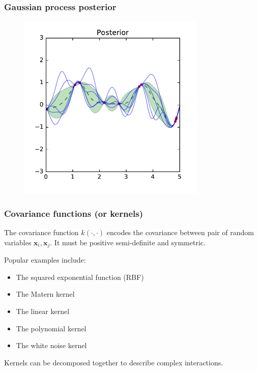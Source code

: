 \documentclass{beamer}
\begin{document}
\begin{frame}
    \frametitle{Gaussian process posterior}

    \begin{figure}
    \includegraphics[width=0.8\textwidth]{./figures/gp-posterior.pdf}
    \end{figure}

\end{frame}


\begin{frame}
    \frametitle{Covariance functions (or kernels)}

    The covariance function $k(\cdot,\cdot)$ encodes the covariance between pair of random variables $\mathbf{x}_i, \mathbf{x}_j$.
    It must be positive semi-definite and symmetric.

    \vspace{0.5cm}

    Popular examples include:
    \begin{itemize}
        \item The squared exponential function (RBF)
        \item The Matern kernel
        \item The linear kernel
        \item The polynomial kernel
        \item The white noise kernel
    \end{itemize}

    \vspace{0.5cm}

    Kernels can be decomposed together to describe complex interactions.
\end{frame}
\end{document}
